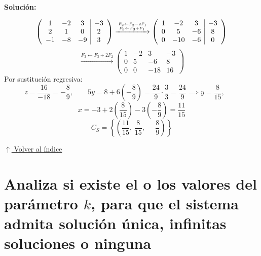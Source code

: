 \documentclass[12pt]{article}
\newcommand{\solucion}{%
    \vspace{0.8em}%
    \textbf{Solución:}%
}
\newcommand{\volverindice}{%
    \vspace{1em}%
    \begin{flushright}%
        \hyperlink{indice}{\small $\uparrow$ Volver al índice}%
    \end{flushright}%
}
\begin{document}
\begin{enumerate}[label=\alph*.-]
    \solucion
    \[
    \left(\begin{array}{ccc|c}
    1 & -2 & 3 & -3 \\ 2 & 1 & 0 & 2 \\ -1 & -8 & -9 & 3
    \end{array}\right)
    \xrightarrow{F_2 \leftarrow F_2 - 2F_1 \atop F_3 \leftarrow F_3 + F_1}
    \left(\begin{array}{ccc|c}
    1 & -2 & 3 & -3 \\ 0 & 5 & -6 & 8 \\ 0 & -10 & -6 & 0
    \end{array}\right)
    \]
    \[
    \xrightarrow{F_3 \leftarrow F_3 + 2F_2}
    \left(\begin{array}{ccc|c}
    1 & -2 & 3 & -3 \\ 0 & 5 & -6 & 8 \\ 0 & 0 & -18 & 16
    \end{array}\right)
    \]
    Por sustitución regresiva:
    \[
    z = \frac{16}{-18} = -\frac{8}{9}, \qquad
    5y = 8 + 6\left(-\frac{8}{9}\right) = \frac{24}{9} \cdot \frac{3}{3} = \frac{24}{9}\implies
    y = \frac{8}{15}, \qquad
    \]
    \[
    x = -3 + 2\left(\frac{8}{15}\right) - 3\left(-\frac{8}{9}\right) = \frac{11}{15}
    \]
    \[
    \boxed{C_S = \left\{\left(\frac{11}{15},\,\frac{8}{15},\,-\frac{8}{9}\right)\right\}}
    \]
\end{enumerate}

\volverindice
\newpage

\section{Analiza si existe el o los valores del parámetro $k$, para que el sistema admita solución única, infinitas soluciones o ninguna}
\end{document}
